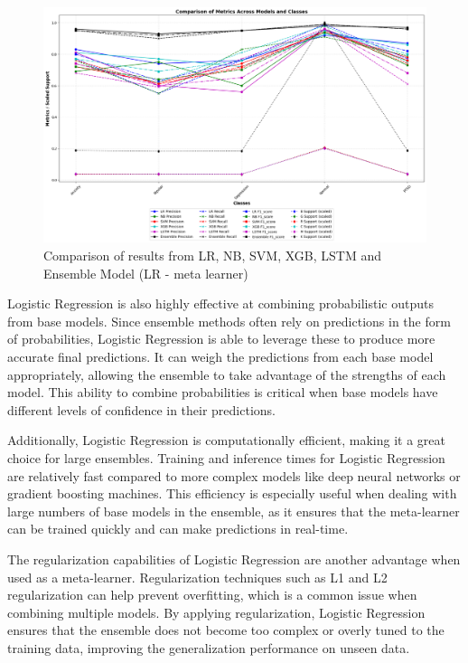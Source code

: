 \begin{figure}[h!]  
    \centering
    \includegraphics[width=1.0\textwidth]{Images/EM FINAL RESULT.png}  
    \caption{Comparison of results from LR, NB, SVM, XGB, LSTM and Ensemble Model (LR - meta learner)}
    \label{dfdl1244883}  %
\end{figure}

\pagebreak

\noindent
Logistic Regression is also highly effective at combining probabilistic outputs from base models. Since ensemble methods often rely on predictions in the form of probabilities, Logistic Regression is able to leverage these to produce more accurate final predictions. It can weigh the predictions from each base model appropriately, allowing the ensemble to take advantage of the strengths of each model. This ability to combine probabilities is critical when base models have different levels of confidence in their predictions.

\vspace{1em}

\noindent
Additionally, Logistic Regression is computationally efficient, making it a great choice for large ensembles. Training and inference times for Logistic Regression are relatively fast compared to more complex models like deep neural networks or gradient boosting machines. This efficiency is especially useful when dealing with large numbers of base models in the ensemble, as it ensures that the meta-learner can be trained quickly and can make predictions in real-time.

\vspace{1em}

\noindent
The regularization capabilities of Logistic Regression are another advantage when used as a meta-learner. Regularization techniques such as L1 and L2 regularization can help prevent overfitting, which is a common issue when combining multiple models. By applying regularization, Logistic Regression ensures that the ensemble does not become too complex or overly tuned to the training data, improving the generalization performance on unseen data.

